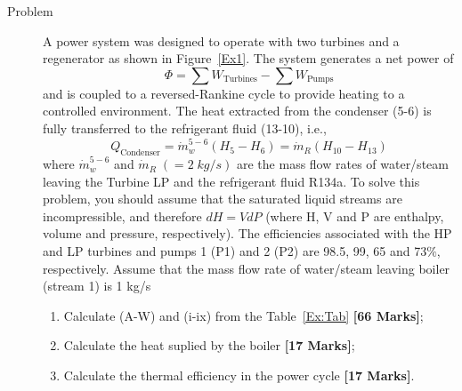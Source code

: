 \documentclass[12pts,a4paper,amsmath,amssymb,floatfix]{article}%
\begin{document}
\begin{description}
\item[Problem] A power system was designed to operate with two turbines and a regenerator as shown in Figure~\ref{Ex1}. The system generates a net power of
\begin{displaymath}
\Phi = \sum W_{\text{Turbines}} -\sum W_{\text{Pumps}}
\end{displaymath}
and is coupled to a reversed-Rankine cycle to provide heating to a controlled environment. The heat extracted from the condenser (5-6) is fully transferred to the refrigerant fluid (13-10), i.e.,
\begin{displaymath}
Q_{\text{Condenser}} = \dot{m}_{w}^{5-6}\left(H_{5}-H_{6}\right)=\dot{m}_{R}\left(H_{10}-H_{13}\right)
\end{displaymath} 
where $\dot{m}_{w}^{5-6}$ and $\dot{m}_{R}\;\left(=2\;kg/s\right)$ are the mass flow rates of water/steam leaving the Turbine LP and the refrigerant fluid R134a. To solve this problem, you should assume that the saturated liquid streams are incompressible, and therefore $dH = VdP$ (where H, V and P are enthalpy, volume and pressure, respectively). The efficiencies associated with the HP and LP turbines and pumps 1 (P1) and 2 (P2) are 98.5, 99, 65 and 73$\%$, respectively. Assume that the mass flow rate of water/steam leaving boiler (stream 1) is 1 kg/s
\begin{enumerate}%
\item Calculate (A-W) and (i-ix) from the Table~\ref{Ex:Tab} {\bf [66 Marks]};
\item Calculate the heat suplied by the boiler {\bf [17 Marks]};
\item Calculate the thermal efficiency in the power cycle {\bf [17 Marks]}.
\end{enumerate}
\end{description}
\end{document}

